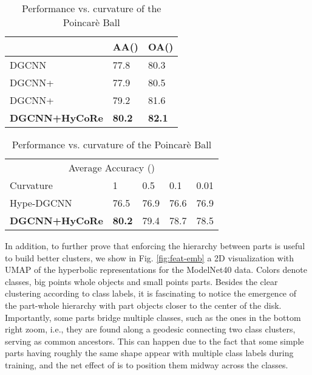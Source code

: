 \documentclass{article}
\begin{document}
\begin{table}
\centering
\begin{minipage}{.49\linewidth}
  \caption{Classification results when one of\\the two regularizations is omitted.}
\label{class-reg}
  \centering
  \begin{tabular}{lll}
    \toprule
& AA()     & OA() \\
    \midrule
    DGCNN      & 77.8 & 80.3         \\
    DGCNN+      & 77.9 & 80.5         \\
    DGCNN+  &  79.2  & 81.6     \\
    \textbf{DGCNN+HyCoRe}  &  \textbf{80.2}  & \textbf{82.1}     \\
    \bottomrule
  \end{tabular}
\end{minipage}
\begin{minipage}{.49\linewidth}
\caption{Performance vs. curvature of the Poincarè Ball}
  \label{class-curv}
  \centering
  \setlength\tabcolsep{4pt} 
  \begin{tabular}{lllll}
    \toprule
    \multicolumn{5}{c}{Average Accuracy ()}                   \\
    \cmidrule(r){1-5}
    Curvature     & 1     & 0.5 & 0.1 & 0.01 \\
    \midrule
    Hype-DGCNN      & 76.5 & 76.9 & 76.6 &  76.9         \\
    \textbf{DGCNN+HyCoRe}  &  \textbf{80.2}  & 79.4 & 78.7 & 78.5    \\
    \bottomrule
  \end{tabular}
\end{minipage}
\end{table}


In addition, to further prove that enforcing the hierarchy between parts is useful to build better clusters, we show in Fig. \ref{fig:feat-emb} a 2D visualization with UMAP of the hyperbolic representations for the ModelNet40 data. Colors denote classes, big points whole objects and small points parts. Besides the clear clustering according to class labels, it is fascinating to notice the emergence of the part-whole hierarchy with part objects closer to the center of the disk. Importantly, some parts bridge multiple classes, such as the ones in the bottom right zoom, i.e., they are found along a geodesic connecting two class clusters, serving as common ancestors. This can happen due to the fact that some simple parts having roughly the same shape appear with multiple class labels during training, and the net effect of  is to position them midway across the classes.   
\end{document}
